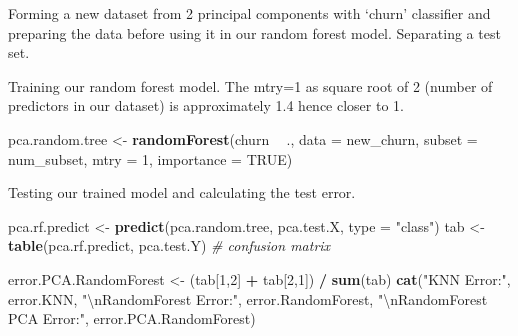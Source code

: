 \documentclass[
]{article}
\newenvironment{Shaded}{\begin{snugshade}}{\end{snugshade}}
\newcommand{\CharTok}[1]{\textcolor[rgb]{0.31,0.60,0.02}{#1}}
\newcommand{\CommentTok}[1]{\textcolor[rgb]{0.56,0.35,0.01}{\textit{#1}}}
\newcommand{\DataTypeTok}[1]{\textcolor[rgb]{0.13,0.29,0.53}{#1}}
\newcommand{\DecValTok}[1]{\textcolor[rgb]{0.00,0.00,0.81}{#1}}
\newcommand{\FloatTok}[1]{\textcolor[rgb]{0.00,0.00,0.81}{#1}}
\newcommand{\KeywordTok}[1]{\textcolor[rgb]{0.13,0.29,0.53}{\textbf{#1}}}
\newcommand{\NormalTok}[1]{#1}
\newcommand{\OperatorTok}[1]{\textcolor[rgb]{0.81,0.36,0.00}{\textbf{#1}}}
\newcommand{\OtherTok}[1]{\textcolor[rgb]{0.56,0.35,0.01}{#1}}
\newcommand{\StringTok}[1]{\textcolor[rgb]{0.31,0.60,0.02}{#1}}
\begin{document}
Forming a new dataset from 2 principal components with `churn'
classifier and preparing the data before using it in our random forest
model. Separating a test set.

\begin{Shaded}
\end{Shaded}

Training our random forest model. The mtry=1 as square root of 2 (number
of predictors in our dataset) is approximately 1.4 hence closer to 1.

\begin{Shaded}
\begin{Highlighting}[]
\NormalTok{pca.random.tree <-}\StringTok{ }\KeywordTok{randomForest}\NormalTok{(churn }\OperatorTok{~}\StringTok{ }\NormalTok{., }\DataTypeTok{data =}\NormalTok{ new_churn, }\DataTypeTok{subset =}\NormalTok{ num_subset, }\DataTypeTok{mtry =} \DecValTok{1}\NormalTok{, }
                            \DataTypeTok{importance =} \OtherTok{TRUE}\NormalTok{)}
\end{Highlighting}
\end{Shaded}

Testing our trained model and calculating the test error.

\begin{Shaded}
\begin{Highlighting}[]
\NormalTok{pca.rf.predict <-}\StringTok{ }\KeywordTok{predict}\NormalTok{(pca.random.tree, pca.test.X, }\DataTypeTok{type =} \StringTok{"class"}\NormalTok{)}
\NormalTok{tab <-}\StringTok{ }\KeywordTok{table}\NormalTok{(pca.rf.predict, pca.test.Y) }\CommentTok{# confusion matrix}

\NormalTok{error.PCA.RandomForest <-}\StringTok{ }\NormalTok{(tab[}\DecValTok{1}\NormalTok{,}\DecValTok{2}\NormalTok{] }\OperatorTok{+}\StringTok{ }\NormalTok{tab[}\DecValTok{2}\NormalTok{,}\DecValTok{1}\NormalTok{]) }\OperatorTok{/}\StringTok{ }\KeywordTok{sum}\NormalTok{(tab)}
\KeywordTok{cat}\NormalTok{(}\StringTok{"KNN Error:"}\NormalTok{, error.KNN, }\StringTok{"}\CharTok{\textbackslash{}n}\StringTok{RandomForest Error:"}\NormalTok{, error.RandomForest, }\StringTok{"}\CharTok{\textbackslash{}n}\StringTok{RandomForest PCA Error:"}\NormalTok{, error.PCA.RandomForest)}
\end{Highlighting}
\end{Shaded}
\end{document}
